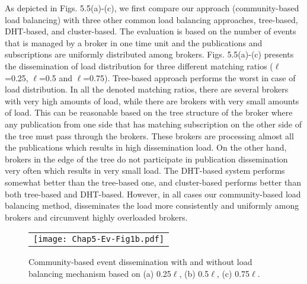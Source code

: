 As depicted in Figs. 5.5(a)-(c), we first compare our approach (community-based load balancing) with three other common load balancing approaches, tree-based, DHT-based, and cluster-based. The evaluation is based on the number of events that is managed by a broker in one time unit and the publications and subscriptions are uniformly distributed among brokers. Figs. 5.5(a)-(c) presents the dissemination of load distribution for three different matching ratios ($\ell$=0.25, $\ell$=0.5 and $\ell$=0.75). Tree-based approach performs the worst in case of load distribution. In all the denoted matching ratios, there are several brokers with very high amounts of load, while there are brokers with very small amounts of load. This can be reasonable based on the tree structure of the broker where any publication from one side that has matching subscription on the other side of the tree must pass through the brokers. These brokers are processing almost all the publications which results in high dissemination load. On the other hand, brokers in the edge of the tree do not participate in publication dissemination very often which results in very small load. The DHT-based system performs somewhat better than the tree-based one, and cluster-based performs better than both tree-based and DHT-based. However, in all cases our community-based load balancing method, disseminates the load more consistently and uniformly among brokers and circumvent highly overloaded brokers.

\begin{figure}[t]
\begin{center}
  \begin{tabular}{c}
  \texttt{[image: Chap5-Ev-Fig1b.pdf]}
  \end{tabular}
  \caption{Community-based event dissemination with and without load balancing mechanism based on (a) 0.25$\ell$, (b) 0.5$\ell$, (c) 0.75$\ell$.}
\end{center}
\end{figure}

